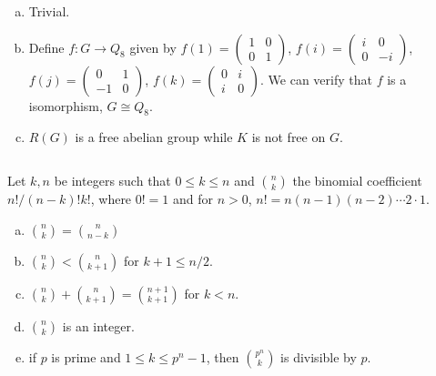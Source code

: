 \begin{answer}
    \begin{enumerate}[(a)]
        \item Trivial.
        \item Define $f:G\to Q_{8}$ given by $f(1)=\begin{pmatrix}
            1&0\\0&1
        \end{pmatrix}$, $f(i)=\begin{pmatrix}
            i&0\\0&-i
        \end{pmatrix}$, $f(j)=\begin{pmatrix}
            0&1\\-1&0
        \end{pmatrix}$, $f(k)=\begin{pmatrix}
            0&i\\i&0
        \end{pmatrix}$. We can verify that $f$ is a isomorphism, $G\cong Q_{8}$.
        \item $R(G)$ is a free abelian group while $K$ is not free on $G$.
    \end{enumerate}
\end{answer}

$$ $$

\begin{ex}
    Let $k, n$ be integers such that $0\leq k\leq n$ and $\binom{n}{k}$ the binomial coefficient $n! /(n-k)!k!$, where $0! =1$ and for $n>0$, $n!=n(n-1)(n-2)\cdots 2\cdot 1$.
    \begin{enumerate}[(a)]
        \item $\binom{n}{k}=\binom{n}{n-k}$
        \item $\binom{n}{k}<\binom{n}{k+1}$ for $k+1\leq n /2$.
        \item $\binom{n}{k}+\binom{n}{k+1}=\binom{n+1}{k+1}$ for $k<n$.
        \item $\binom{n}{k}$ is an integer.
        \item if $p$ is prime and $1\leq k\leq p^{n}-1$, then $\binom{p^{n}}{k}$ is divisible by $p$.
    \end{enumerate}
\end{ex}

